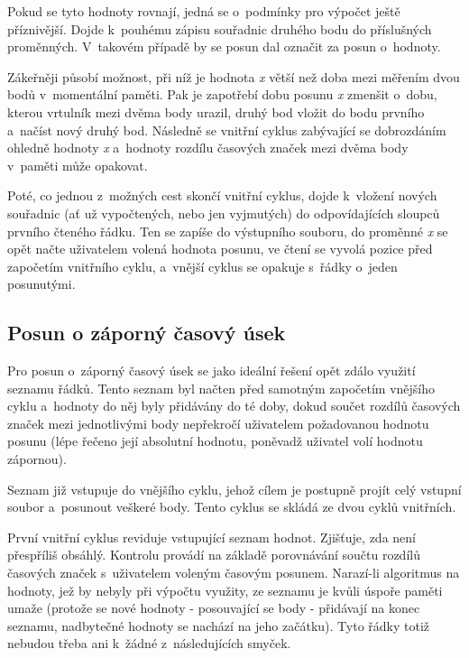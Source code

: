 Pokud se tyto hodnoty rovnají, jedná se o~podmínky pro výpočet ještě příznivější. Dojde k~pouhému
zápisu souřadnic druhého bodu do příslušných proměnných. V~ta\-ko\-vém
případě by se posun dal označit za posun o~hodnoty. 

Zákeřněji působí možnost, při níž je hodnota \textit{x} větší než doba mezi měřením dvou
bodů v~momentální paměti. Pak je zapotřebí dobu posunu \textit{x} zmenšit o~dobu, kterou
vrtulník mezi dvěma body urazil, druhý bod vložit do bodu prvního a~načíst nový druhý bod. Následně
se vnitřní cyklus zabývající se dobrozdáním ohledně hodnoty \textit{x} a~hodnoty
rozdílu časových značek mezi dvěma body v~paměti může opakovat. 

Poté, co jednou z~možných cest skončí vnitřní cyklus, dojde k~vložení nových souřadnic
(ať už vypočtených, nebo jen vyjmutých) do odpovídajících sloupců první\-ho čteného řádku.
Ten se zapíše do výstupního souboru, do proměnné \textit{x} se opět načte uživatelem volená
hodnota posunu, ve čtení se vyvolá pozice před započetím vnitřního cyklu, a~vnější cyklus se
opakuje s~řádky o~jeden posunutými. 

\subsection{Posun o záporný časový úsek}
\label{zapornycas}

Pro posun o~záporný časový úsek se jako ideální řešení opět zdálo využití seznamu řádků.
Tento seznam byl načten před samotným započetím vnějšího cyklu a~hodnoty do něj byly
přidávány do té doby, dokud součet rozdílů časových značek mezi jednotlivými body
nepřekročí uživatelem požadovanou hodnotu posunu (lépe řečeno její absolutní hodnotu,
poněvadž uživatel volí hodnotu zápornou). 

Seznam již vstupuje do vnějšího cyklu, jehož cílem je postupně projít celý vstupní
soubor a~posunout veškeré body. Tento cyklus se skládá ze dvou cyklů vnitřních. 

První vnitřní cyklus reviduje vstupující seznam hodnot. Zjišťuje, zda není přes\-příliš obsáhlý.
Kontrolu provádí na základě porovnávání součtu rozdílů časových značek s~uživatelem
voleným časovým posunem. Narazí-li algoritmus na hodnoty, jež by nebyly při výpočtu využity,
ze seznamu je kvůli úspoře paměti umaže (protože se nové hodnoty - posouvající se body - přidávají
na konec seznamu, nadbytečné hodnoty se nachází na jeho začátku). Tyto řádky totiž nebudou
třeba ani k~žádné z~následujících smyček. 

